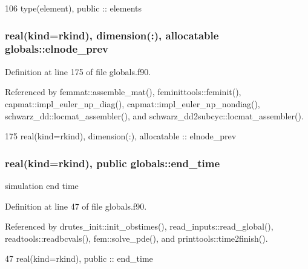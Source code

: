 \begin{DoxyCode}
106   \textcolor{keywordtype}{type}(element),  \textcolor{keywordtype}{public} :: elements
\end{DoxyCode}
\subsubsection[{elnode\+\_\+prev}]{\setlength{\rightskip}{0pt plus 5cm}real(kind=rkind), dimension(\+:), allocatable globals\+::elnode\+\_\+prev}\label{namespaceglobals_a2480f74b9fe7a63101d1f1b6380c0f14}


Definition at line 175 of file globals.\+f90.



Referenced by femmat\+::assemble\+\_\+mat(), feminittools\+::feminit(), capmat\+::impl\+\_\+euler\+\_\+np\+\_\+diag(), capmat\+::impl\+\_\+euler\+\_\+np\+\_\+nondiag(), schwarz\+\_\+dd\+::locmat\+\_\+assembler(), and schwarz\+\_\+dd2subcyc\+::locmat\+\_\+assembler().


\begin{DoxyCode}
175   \textcolor{keywordtype}{real(kind=rkind)}, \textcolor{keywordtype}{dimension(:)}, \textcolor{keywordtype}{allocatable} :: elnode_prev
\end{DoxyCode}
\subsubsection[{end\+\_\+time}]{\setlength{\rightskip}{0pt plus 5cm}real(kind=rkind), public globals\+::end\+\_\+time}\label{namespaceglobals_aae1a93edf28eef71d60b8617914ffc78}


simulation end time 



Definition at line 47 of file globals.\+f90.



Referenced by drutes\+\_\+init\+::init\+\_\+obstimes(), read\+\_\+inputs\+::read\+\_\+global(), readtools\+::readbcvals(), fem\+::solve\+\_\+pde(), and printtools\+::time2finish().


\begin{DoxyCode}
47   \textcolor{keywordtype}{real(kind=rkind)}, \textcolor{keywordtype}{public} :: end_time
\end{DoxyCode}
